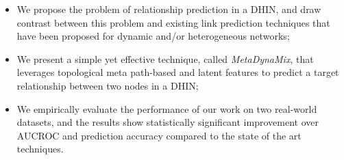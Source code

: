 



\begin{itemize}

\item We propose the problem of relationship prediction in a DHIN, and draw contrast between this problem and existing link prediction techniques that have been proposed for dynamic and/or heterogeneous networks;

\item We present a simple yet effective technique, called \textit{MetaDynaMix}, that leverages topological meta path-based and latent features to predict a target relationship between two nodes in a DHIN;



\item We empirically evaluate the performance of our work on two real-world datasets, and the results show statistically significant improvement over AUCROC and prediction accuracy compared to the state of the art techniques.

\end{itemize}


